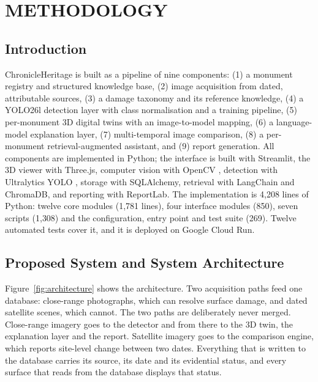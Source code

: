 \documentclass[a4paper,12pt,oneside]{book}
\begin{document}
\chapter{METHODOLOGY}

\section{Introduction}
ChronicleHeritage is built as a pipeline of nine components: (1) a monument registry and structured knowledge base, (2) image acquisition from dated, attributable sources, (3) a damage taxonomy and its reference knowledge, (4) a YOLO26l detection layer with class normalisation and a training pipeline, (5) per-monument 3D digital twins with an image-to-model mapping, (6) a language-model explanation layer, (7) multi-temporal image comparison, (8) a per-monument retrieval-augmented assistant, and (9) report generation. All components are implemented in Python; the interface is built with Streamlit, the 3D viewer with Three.js, computer vision with OpenCV \cite{bradski2000opencv}, detection with Ultralytics YOLO \cite{ultralytics2023yolo}, storage with SQLAlchemy, retrieval with LangChain and ChromaDB, and reporting with ReportLab. The implementation is 4{,}208 lines of Python: twelve core modules (1{,}781 lines), four interface modules (850), seven scripts (1{,}308) and the configuration, entry point and test suite (269). Twelve automated tests cover it, and it is deployed on Google Cloud Run.

\section{Proposed System and System Architecture}
Figure~\ref{fig:architecture} shows the architecture. Two acquisition paths feed one database: close-range photographs, which can resolve surface damage, and dated satellite scenes, which cannot. The two paths are deliberately never merged. Close-range imagery goes to the detector and from there to the 3D twin, the explanation layer and the report. Satellite imagery goes to the comparison engine, which reports site-level change between two dates. Everything that is written to the database carries its source, its date and its evidential status, and every surface that reads from the database displays that status.
\end{document}
